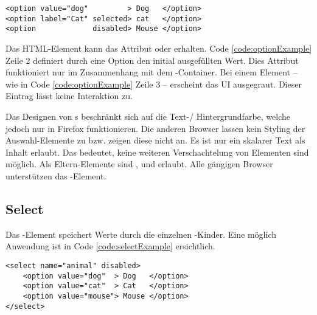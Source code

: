 \begin{lstlisting}[style = htmlcssjs, caption = Option Beispiel, label = code:optionExample]
<option value="dog"         > Dog   </option>
<option label="Cat" selected> cat   </option>
<option             disabled> Mouse </option>
\end{lstlisting}    

Das HTML-Element kann das Attribut  oder  erhalten.
Code \ref{code:optionExample} Zeile 2 definiert durch eine  Option den initial ausgefüllten Wert.
Dies Attribut funktioniert nur im Zusammenhang mit dem -Container. 
Bei einem  Element – wie in Code \ref{code:optionExample} Zeile 3 – erscheint das UI ausgegraut.
Dieser Eintrag lässt keine Interaktion zu.

Das Designen von s beschränkt sich auf die Text-/ Hintergrundfarbe, welche jedoch nur in Firefox funktionieren. 
Die anderen Browser lassen kein Styling der Auswahl-Elemente zu bzw. zeigen diese nicht an.
Es ist nur ein skalarer Text als Inhalt erlaubt. 
Das bedeutet, keine weiteren Verschachtelung von Elementen sind möglich.
Als Eltern-Elemente sind ,  und  erlaubt.
Alle gängigen Browser unterstützen das -Element.


\subsection{Select}
\label{sec:select}

Das -Element speichert Werte durch die einzelnen -Kinder.
Eine möglich Anwendung ist in Code \ref{code:selectExample} ersichtlich.

\begin{lstlisting}[style = htmlcssjs, caption = Disabled Select Beispiel, label = code:selectExample]
<select name="animal" disabled>
    <option value="dog"  > Dog   </option>
    <option value="cat"  > Cat   </option>
    <option value="mouse"> Mouse </option>
</select>
\end{lstlisting}

